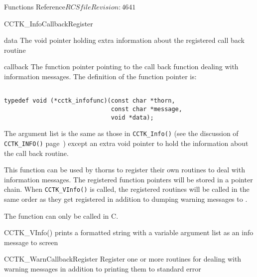 \begin{cactuspart}{ Functions Reference}{$RCSfile$}{$Revision: 4641 $}
\begin{FunctionDescription}{CCTK\_InfoCallbackRegister}
\begin{ParameterSection}
\begin{Parameter}{data}
The void pointer holding extra information about the registered call back
routine
\end{Parameter}

\begin{Parameter}{callback}
The function pointer pointing to the call back function dealing with
information messages. The definition of the function pointer is:
\begin{verbatim}

typedef void (*cctk_infofunc)(const char *thorn,
                              const char *message,
                              void *data);

\end{verbatim}

The argument list is the same as those in \verb|CCTK_Info()|
(see the discussion of \verb|CCTK_INFO()| page~\pageref{CCTK-INFO})
except an extra void pointer to hold the information about the call
back routine.

\end{Parameter}

\end{ParameterSection}

\begin{Discussion}

This function can be used by thorns to register their own routines to
deal with information messages. The registered function pointers will be
stored in a pointer chain. When \verb|CCTK_VInfo()| is called, the
registered routines will be called in the same order as they get
registered in addition to dumping warning messages to .

The function can only be called in C.

\end{Discussion}

\begin{SeeAlsoSection}
\begin{SeeAlso}{CCTK\_VInfo()}
prints a formatted string with a variable argument list as an info message to
screen
\end{SeeAlso}

\begin{SeeAlso}{CCTK\_WarnCallbackRegister}
Register one or more routines for dealing with warning messages in addition
to printing them to standard error
\end{SeeAlso}


\end{SeeAlsoSection}
\end{FunctionDescription}
\end{cactuspart}
